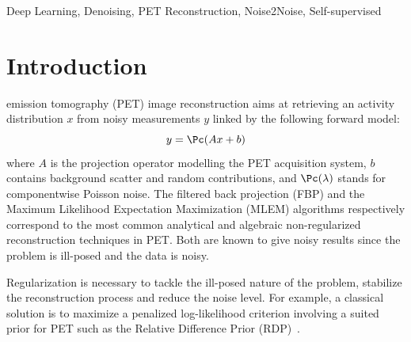 \documentclass{IEEEtran}
\begin{document}
\begin{IEEEkeywords}
Deep Learning, Denoising, PET Reconstruction, Noise2Noise, Self-supervised
\end{IEEEkeywords}

\section{Introduction}
\label{sec:introduction}
 emission tomography (PET) image reconstruction aims at retrieving an activity distribution $x$ from noisy measurements $y$ linked by the following forward model:
%
\begin{equation}
    y = \Pc(Ax + b)
\end{equation}
where $A$ is the projection operator modelling the PET acquisition system, $b$ contains background scatter and random contributions, and $\Pc(\lambda)$ stands for componentwise Poisson noise.
The filtered back projection (FBP) and the Maximum Likelihood Expectation Maximization (MLEM) algorithms respectively correspond to the most common analytical and algebraic non-regularized reconstruction techniques in PET.
Both are known to give noisy
results since the problem is ill-posed and the data is noisy. 

Regularization is necessary to tackle the ill-posed nature of the problem, stabilize the reconstruction process and reduce the noise level. For example, a classical solution is to maximize a penalized log-likelihood criterion involving a suited prior for PET such as the Relative Difference Prior (RDP)~\cite{Nuyts02}.
\end{document}
